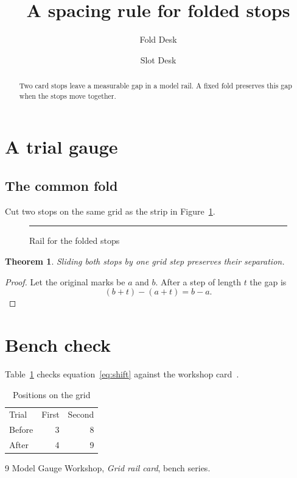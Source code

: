 \documentclass{amsproc}
\title[Folded stops]{A spacing rule for folded stops}
\author{Fold Desk}\address{Model Gauge Workshop, Fold Bench}
\author{Slot Desk}\address{Model Gauge Workshop, Slot Bench}
\newtheorem{theorem}{Theorem}
\begin{document}
\begin{abstract}
Two card stops leave a measurable gap in a model rail. A fixed fold preserves
this gap when the stops move together.
\end{abstract}
\maketitle
\section{A trial gauge}
\subsection{The common fold}
Cut two stops on the same grid as the strip in Figure~\ref{fig:rail}.
\begin{figure}[htbp]
\centering\rule{30mm}{2mm}
\caption{Rail for the folded stops}\label{fig:rail}
\end{figure}
\begin{theorem}
Sliding both stops by one grid step preserves their separation.
\end{theorem}
\begin{proof}
Let the original marks be $a$ and $b$. After a step of length $t$ the gap is
\begin{equation}\label{eq:shift}
(b+t)-(a+t)=b-a .
\end{equation}
\end{proof}
\newpage
\section{Bench check}
Table~\ref{tab:shift} checks equation~\eqref{eq:shift} against the workshop card~\cite{card}.
\begin{table}[htbp]
\centering\caption{Positions on the grid}\label{tab:shift}
\begin{tabular}{lrr}Trial & First & Second\\Before & 3 & 8\\After & 4 & 9\end{tabular}
\end{table}
\begin{thebibliography}{9}
 Model Gauge Workshop, \emph{Grid rail card}, bench series.
\end{thebibliography}
\end{document}
